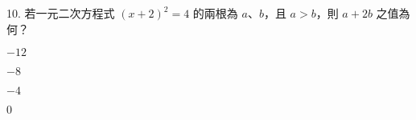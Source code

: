 \documentclass[12pt]{article}
\begin{document}
\begin{problem}
  \item[10.] 若一元二次方程式 $(x+2)^2 = 4$ 的兩根為 $a$、$b$，且 $a > b$，則 $a + 2b$ 之值為何？
  \begin{choices}
    \item $-12$
    \item $-8$
    \item $-4$
    \item $0$
  \end{choices}
\end{problem}
\end{document}

